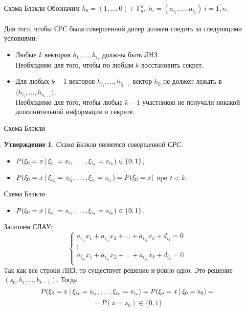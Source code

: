\documentclass{beamer}
\newtheorem{claim}{Утверждение}
\begin{document}
\begin{frame}{Схэма Блэкли}
    Обозначим \(
         h_0 = (1, \dots, 0) \in \mathbb{F}_q^k, \ 
         h_i = (a_{i_1}, \dots, a_{i_k}) \ i = \overline{1, n}\). \\ \ \\
    Для того, чтобы СРС была совершенной дилер должен следить за следующими условиями:
    \begin{itemize}
        \item Любые \(k\) векторов \(h_{i_i}, \dots, h_{i_{k}}\) должны быть ЛНЗ. \\
        Необходимо для того, чтобы по любым \(k\) восстановить секрет.
        \item Для любых \(k - 1\) векторов \(h_{i_i}, \dots, h_{i_{k - 1}}\) вектор \(h_0\) не должен лежать в \(\langle h_{i_i}, \dots, h_{i_{k - 1}} \rangle\). \\
        Необходимо для того, чтобы любые \(k - 1\) участников не получали никакой дополнительной информации о секрете.
    \end{itemize}
\end{frame}

\begin{frame}{Схема Блэкли}
    \begin{claim}
        Схэма Блэкли является совершенной СРС.
    \end{claim}
    \begin{itemize}
        \item \(P(\xi_0 = x \ \vline \ \xi_{i_1} = s_{i_1}, \dots, \xi_{i_k} = s_{i_k}) \in \{ 0, 1 \} \); \\
        \item \(P(\xi_0 = x \ \vline \ \xi_{i_1} = s_{i_1}, \dots, \xi_{i_t} = s_{i_t}) = P(\xi_0 = x) \) при \(t < k\).
    \end{itemize}
\end{frame}

\begin{frame}{Схема Блэкли}
    \begin{itemize}
        \item \(P(\xi_0 = x \ \vline \ \xi_{i_1} = s_{i_1}, \dots, \xi_{i_k} = s_{i_k}) \in \{ 0, 1 \} \).
    \end{itemize}
    Запишем СЛАУ:
    \[
    \begin{cases}
        a_{i_1_1}x_1 + a_{i_1_2}x_2 + \dots + a_{i_1_k}x_{k} + d_{i_1} = 0 \\
        \vdots \\
        a_{i_k_1}x_1 + a_{i_k_2}x_2 + \dots + a_{i_k_k}x_{k} + d_{i_k} = 0 \\
    \end{cases}
    \]
    Так как все строки ЛНЗ, то существует решение и ровно одно. Это решение \((s_0, b_1, \dots, b_{k - 1})\). Тогда 
    \[
    P(\xi_0 = x \ \vline \ \xi_{i_1} = s_{i_1}, \dots, \xi_{i_k} = s_{i_k}) = P(\xi_o = x \ \vline \ \xi_0 = s_0) =
    \]
    \[
    = P(x = s_0) \in \{0, 1\}
    \]
\end{frame}
\end{document}
